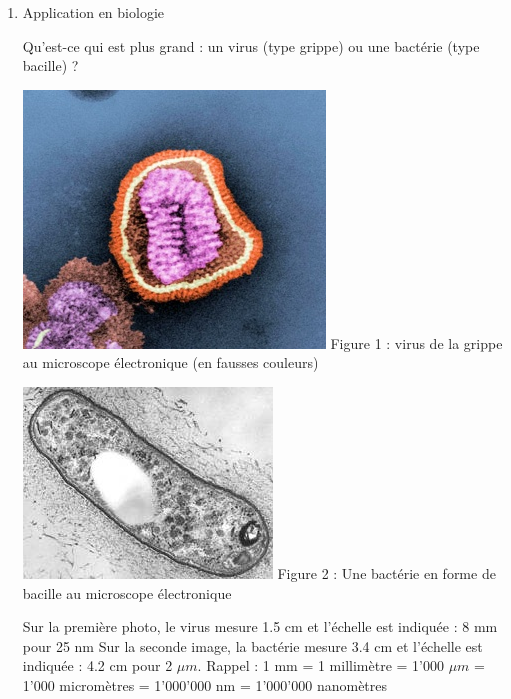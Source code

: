 \begin{exercice}
\begin{enumerate}
\item Application en biologie

Qu’est-ce qui est plus grand : un virus (type grippe) ou une bactérie (type bacille) ?

 
 \includegraphics{fractions/virus.png}
Figure 1 : virus de la grippe au microscope électronique (en fausses couleurs)

 \includegraphics{fractions/bacterie.png}
Figure 2 : Une bactérie en forme de bacille
au microscope électronique

 
Sur la première photo, le virus mesure 1.5 cm et l'échelle est indiquée : 8 mm pour 25 nm
Sur la seconde image, la bactérie mesure 3.4 cm et l'échelle est indiquée : 4.2 cm pour 2 $\mu m$.
Rappel : 1 mm = 1 millimètre = 1'000 $\mu m$ = 1'000 micromètres = 1'000'000 nm = 1'000'000 nanomètres 
\end{enumerate}

\end{exercice}